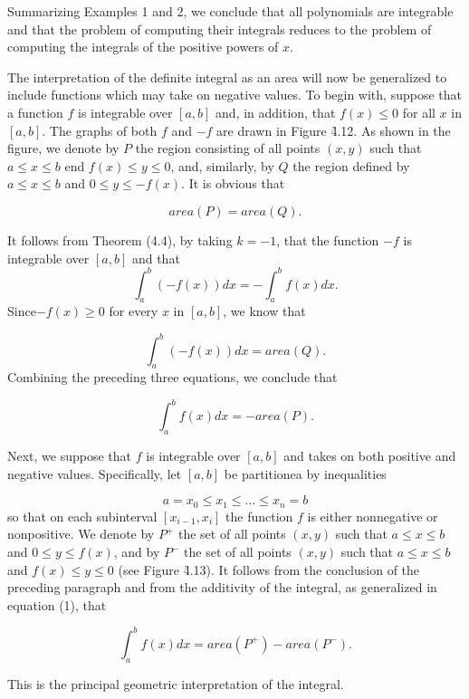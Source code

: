 Summarizing Examples 1 and 2, we conclude that all polynomials are integrable and that the problem of computing their integrals reduces to the problem of computing the integrals of the positive powers of $x$.

The interpretation of the definite integral as an area will now be generalized to include functions which may take on negative values. To begin with, suppose that a function $f$ is integrable over $[a, b]$ and, in addition, that
$f (x) \leq 0$ for all $x$ in $[a, b]$. The graphs of both $f$ and $-f$ are drawn
in Figure \f{4.12}. As shown in the figure, we denote by $P$ the region consisting of all points $(x, y)$ such that $a \leq x \leq b$ end $f(x) \leq y \leq 0$, and, similarly, by $Q$ the region defined by $a \leq x \leq b$ and $0 \leq y \leq -f(x)$. It is obvious that 

$$
area(P) = area(Q).
$$


\noindent It follows from Theorem (4.4), by taking $k = -1$, that the function $-f$ is integrable over $[a, b]$ and that   
$$
\int_{a}^{b} (-f(x)) dx = - \int_{a}^{b} f(x) dx.
$$
Since$-f(x) \geq 0$ for every $x$ in $[a, b]$, we know that 
 
$$
\int_{a}^{b} (-f(x)) dx = area(Q).
$$
\noindent Combining the preceding three equations, we conclude that  

$$
\int_{a}^{b} f (x) dx = -area(P).
$$

Next, we suppose that $f$ is integrable over $[a, b]$ and takes on both positive and negative values. Specifically, let $[a, b]$ be partitionea by inequalities

$$
a = x_0 \leq x_1 \leq ... \leq x_n  = b
$$
\noindent so that on each subinterval $[x_{i -1}, x_i]$ the function $f$ is either nonnegative or nonpositive. We denote by $P^{+}$ the set of all points $(x, y)$ such that $a \leq x \leq b$ and $0 \leq y \leq f(x)$, and by $P^{-}$ the set of all points $(x, y)$ such that $a \leq x \leq b$
and $f(x) \leq y \leq 0$ (see Figure \f{4.13}). It follows from the conclusion of the preceding paragraph and from the additivity of the integral, as generalized in equation (1), that


\begin{theorem} %
$$
\int_{a}^{b} f(x) dx = area(P^{+}) - area(P^{-}).
$$
\end{theorem}

\noindent This is the principal geometric interpretation of the integral.

